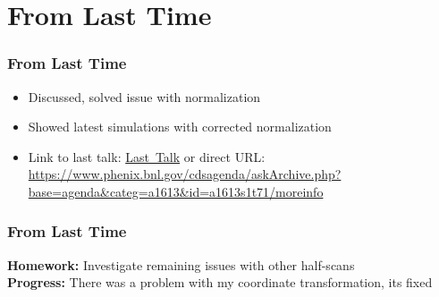 \section{From Last Time}
\label{sec:from_last_time}

\begin{frame}
  \frametitle{From Last Time}
  \begin{itemize}
    \item Discussed, solved issue with normalization
    \item Showed latest simulations with corrected normalization
    \item Link to last talk:
      \href{https://www.phenix.bnl.gov/cdsagenda/askArchive.php?base=agenda&categ=a1613&id=a1613s1t71/moreinfo}{Last~Talk}
      or direct URL: \url{https://www.phenix.bnl.gov/cdsagenda/askArchive.php?base=agenda&categ=a1613&id=a1613s1t71/moreinfo}
  \end{itemize}
\end{frame}

\begin{frame}
  \frametitle{From Last Time}
  \textbf{Homework:} Investigate remaining issues with other half-scans\\
  \textbf{Progress:} There was a problem with my coordinate transformation, its
  fixed\\
\end{frame}
